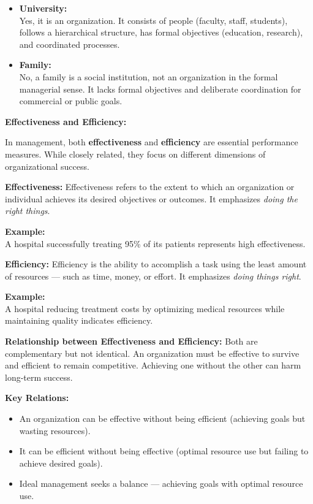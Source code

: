 \documentclass[10pt,a4paper]{book}
\begin{document}
\begin{multicols}{2}
\begin{itemize}
    \item \textbf{University:} \\
    Yes, it is an organization. It consists of people (faculty, staff, students), follows a hierarchical structure, has formal objectives (education, research), and coordinated processes.

    \item \textbf{Family:} \\
    No, a family is a social institution, not an organization in the formal managerial sense. It lacks formal objectives and deliberate coordination for commercial or public goals.
\end{itemize}


\textbf{Effectiveness and Efficiency:}

In management, both \textbf{effectiveness} and \textbf{efficiency} are essential performance measures. While closely related, they focus on different dimensions of organizational success.

\textbf{Effectiveness:}
Effectiveness refers to the extent to which an organization or individual achieves its desired objectives or outcomes. It emphasizes \textit{doing the right things}.

\textbf{Example:}\\
A hospital successfully treating 95\% of its patients represents high effectiveness.

\textbf{Efficiency:}
Efficiency is the ability to accomplish a task using the least amount of resources — such as time, money, or effort. It emphasizes \textit{doing things right}.

\textbf{Example:}\\
A hospital reducing treatment costs by optimizing medical resources while maintaining quality indicates efficiency.

\textbf{Relationship between Effectiveness and Efficiency:}
Both are complementary but not identical. An organization must be effective to survive and efficient to remain competitive. Achieving one without the other can harm long-term success.

\textbf{Key Relations:}
\begin{itemize}
    \item An organization can be effective without being efficient (achieving goals but wasting resources).
    \item It can be efficient without being effective (optimal resource use but failing to achieve desired goals).
    \item Ideal management seeks a balance — achieving goals with optimal resource use.
\end{itemize}
\end{multicols}
\end{document}
